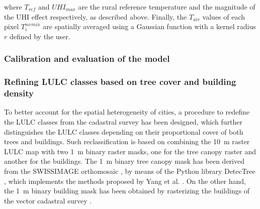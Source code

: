 \documentclass[12pt]{iopart}
\begin{document}
where $T_{ref}$ and $UHI_{max}$ are the rural reference temperature and the magnitude of the UHI effect respectively, as described above.
Finally, the $T_{air}$ values of each pixel $T_i^{no \, mix}$ are spatially averaged using a Gaussian function with a kernel radius $r$ defined by the user.


\subsubsection{Calibration and evaluation of the model}




\subsubsection{Refining LULC classes based on tree cover and building density}
\label{sec:refin-lulc-class}

To better account for the spatial heterogeneity of cities, a procedure to redefine the LULC classes from the cadastral survey has been designed, which further distinguishes the LULC classes depending on their proportional cover of both trees and buildings. Such reclassification is based on combining the 10~m raster LULC map with two 1~m binary raster masks, one for the tree canopy raster and another for the buildings. %
The 1~m binary tree canopy mask has been derived from the SWISSIMAGE orthomosaic \cite{swisstopo2019swissimage}, by means of the Python library DetecTree \cite{bosch2020detectree}, which implements the methods proposed by Yang et al. \cite{yang2009tree}. On the other hand, the 1~m binary building mask has been obtained by rasterizing the buildings of the vector cadastral survey \cite{asitvd2018structure}.
\end{document}
